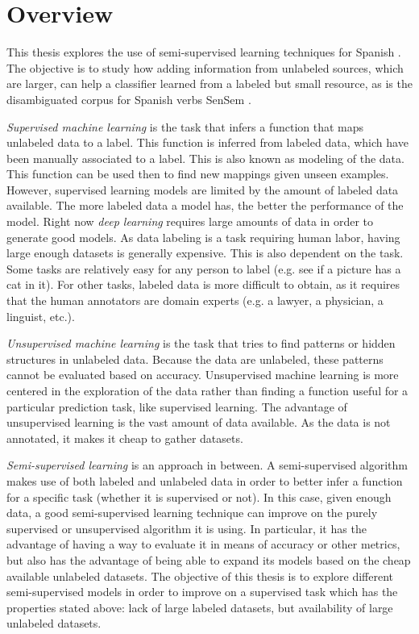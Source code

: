 \section{Overview}\label{section:introduction:overview} 

This thesis explores the use of semi-supervised learning techniques for Spanish
\vsd. The objective is to study how adding information from unlabeled sources,
which are larger, can help a classifier learned from a labeled but small
resource, as is the disambiguated corpus for Spanish verbs SenSem
\cite{alonso-etal-07-sensem}.

{\em Supervised machine learning} is the task that infers a function that maps
unlabeled data to a label. This function is inferred from labeled data, which
have been manually associated to a label. This is also known as modeling of the
data.  This function can be used then to find new mappings given unseen
examples. However, supervised learning models are limited by the amount of
labeled data available. The more labeled data a model has, the better the
performance of the model. Right now {\em deep learning} requires large amounts
of data in order to generate good models. As data labeling is a task requiring
human labor, having large enough datasets is generally expensive. This is also
dependent on the task. Some tasks are relatively easy for any person to label
(e.g. see if a picture has a cat in it). For other tasks, labeled data is more
difficult to obtain, as it requires that the human annotators are domain
experts (e.g. a lawyer, a physician, a linguist, etc.).

{\em Unsupervised machine learning} is the task that tries to find patterns or
hidden structures in unlabeled data. Because the data are unlabeled, these
patterns cannot be evaluated based on accuracy. Unsupervised machine learning
is more centered in the exploration of the data rather than finding a function
useful for a particular prediction task, like supervised learning. The
advantage of unsupervised learning is the vast amount of data available. As the
data is not annotated, it makes it cheap to gather datasets.

{\em Semi-supervised learning} is an approach in between. A semi-supervised
algorithm makes use of both labeled and unlabeled data in order to better infer
a function for a specific task (whether it is supervised or not). In this case,
given enough data, a good semi-supervised learning technique can improve on the
purely supervised or unsupervised algorithm it is using. In particular, it has
the advantage of having a way to evaluate it in means of accuracy or other
metrics, but also has the advantage of being able to expand its models based on
the cheap available unlabeled datasets. The objective of this thesis is to
explore different semi-supervised models in order to improve on a supervised
task which has the properties stated above: lack of large labeled datasets, but
availability of large unlabeled datasets.

